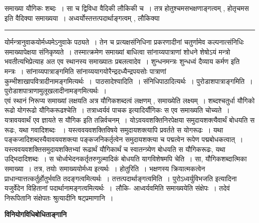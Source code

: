 \documentclass[11pt, openany]{book}
\begin{document}
{\bl समाख्या यौगिकः शब्दः~। सा च द्विविधा {\qtl वैदिकी लौकिकी च~}। तत्र {\qtl होतुश्चमसभक्षणाङ्गत्वम् , होतृचमस इति वैदिक्या समाख्यया~।  अध्वर्योस्तत्तत्पदार्थाङ्गत्वम् , लौकिक्या}}\\
\hrule
\vspace{3mm}
\noindent
योर्मन्त्रानुवाकयोर्मध्यमेऽनुवाके पठ्यते~। तेन च प्रत्यक्षसंनिधिना प्रकरणादीनां चतुर्णामेव कल्पनात्संनिधिः समाख्यापेक्षया संनिकृष्यते~। तस्मात्क्रमेण समाख्यां बाधित्वा सांनाय्यपात्राणां शोधने शेषोऽयं मन्त्रो भवतीत्यभिप्रेत्याह अत एव स्थानस्य समाख्यातः प्रबलत्वादेव~। शुन्धनमन्त्रः {\qt शुन्धध्वं दैव्याय कर्मण} इति मन्त्रः~। सांनाय्यपात्राङ्गमिति सांनाय्ययागयोरैन्द्रदध्यैन्द्रपयसोः पात्राणां कुम्भीशाखापवित्रादीनामङ्गमित्यर्थः~।~{\br पाठसादेश्यादिति~।}
संनिधिपाठादित्यर्थः~। {\br पुरोडाशपात्राङ्गमिति~।} पुरोडाशपात्राणामुलूखलादीनामङ्गमित्यर्थः~।\\

 एवं स्थानं निरूप्य समाख्यां लक्षयति अत्र यौगिकशब्दत्वं लक्षणम् , समाख्येति लक्ष्यम्~। शब्दश्चतुर्धा {\ab यौगिको
रूढो योगरूढो यौगिकरूढश्चेति~}। तत्राध्वर्यवं पाचक इत्यादिर्यौगिकः स एव समाख्यति चोच्यते~। यत्रावयवार्थं एव ज्ञायते स यौगिक इति तन्निर्वचनम्~। योऽवयवशक्तिनिरपेक्षया समुदायशक्त्यैवार्थं बोधयति स रूढः, यथा गवादिशब्दः ~। यस्त्ववयवशक्तिविषये समुदायशक्त्यापि प्रवर्तते स योगरूढः~। यथा पङ्कजादिशब्दस्यैवावयवशक्त्या पङ्कजनिकर्तृत्वेन समुदायशक्त्या च पद्मत्वेन रूपेण पद्मबोधकत्वात्~। यस्त्ववयवशक्तिसमुदायशक्तिभ्यां रूढार्थं यौगिकार्थं च स्वातन्त्र्येण बोधयति स यौगिकरूढः, यथा {\qt उद्भिदादिशब्दः~}। स चोर्ध्वभेदनकर्तृतरुगुल्मादिकं बोधयति यागविशेषमपि चेति~। सा, यौगिकशब्दात्मिका समाख्या~। तत्र, तयोः समाख्ययोर्मध्य इत्यर्थः~। {\br होतुरिति~।} भक्षणस्य क्रियात्मकत्वेन प्राधान्यात्तत्कर्तुर्होतुर्भवति तदङ्गत्वमित्यर्थः~। {\br तत्तत्पदार्थाङ्गत्वमिति~।} {\qt पुरोऽध्वर्युविभजति}
इत्यादिना यजुर्वेदेन विहितानां पदार्थानामङ्गत्वमित्यर्थः~।~{\br लौकि- }
\newpage
\fancyhead[LO]{[विनि० वि० बोधि० ]}
{\bl\noindent आध्वर्यवमिति समाख्ययेति संक्षेपः~। तदेवं निरूपितानि संक्षेपतः श्रुत्यादीनि षट्प्रमाणानि~।}
\begin{center}
\textbf{विनियोगविधिबोधिताङ्गानि}    
\end{center}
\end{document}

